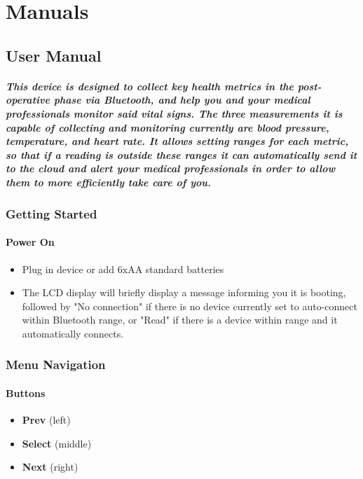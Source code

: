 \chapter*{Manuals}

\section*{User Manual}
\paragraph{This device is designed to collect key health metrics in the post-operative phase via Bluetooth, and help you and your medical professionals monitor said vital signs. The three measurements it is capable of collecting and monitoring currently are blood pressure, temperature, and heart rate. It allows setting ranges for each metric, so that if a reading is outside these ranges it can automatically send it to the cloud and alert your medical professionals in order to allow them to more efficiently take care of you.}

\subsection{Getting Started}
\subsubsection{Power On}
\begin{itemize}
	\item Plug in device or add 6xAA standard batteries
	\item The LCD display will briefly display a message informing you it is booting, followed by "No connection" if there is no device currently set to auto-connect within Bluetooth range, or "Read" if there is a device within range and it automatically connects.
\end{itemize}

\subsection{Menu Navigation}
\subsubsection{Buttons}
\begin{itemize}
	\item \textbf{Prev} (left)
	\item \textbf{Select} (middle)
	\item \textbf{Next} (right)
\end{itemize}
